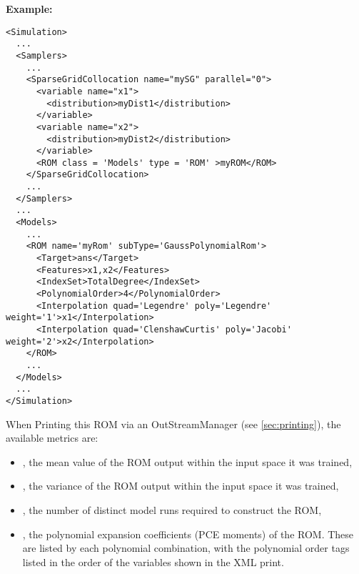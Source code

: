 \textbf{Example:}
{\footnotesize
\begin{lstlisting}[style=XML,morekeywords={name,subType}]
<Simulation>
  ...
  <Samplers>
    ...
    <SparseGridCollocation name="mySG" parallel="0">
      <variable name="x1">
        <distribution>myDist1</distribution>
      </variable>
      <variable name="x2">
        <distribution>myDist2</distribution>
      </variable>
      <ROM class = 'Models' type = 'ROM' >myROM</ROM>
    </SparseGridCollocation>
    ...
  </Samplers>
  ...
  <Models>
    ...
    <ROM name='myRom' subType='GaussPolynomialRom'>
      <Target>ans</Target>
      <Features>x1,x2</Features>
      <IndexSet>TotalDegree</IndexSet>
      <PolynomialOrder>4</PolynomialOrder>
      <Interpolation quad='Legendre' poly='Legendre' weight='1'>x1</Interpolation>
      <Interpolation quad='ClenshawCurtis' poly='Jacobi' weight='2'>x2</Interpolation>
    </ROM>
    ...
  </Models>
  ...
</Simulation>
\end{lstlisting}
}

When Printing this ROM via an OutStreamManager (see \ref{sec:printing}), the available metrics are:
\begin{itemize}
  \item {}, the mean value of the ROM output within the input space it was trained,
  \item {}, the variance of the ROM output within the input space it was trained,
  \item {}, the number of distinct model runs required to construct the ROM,
  \item {}, the polynomial expansion coefficients (PCE moments) of the ROM.  These are
    listed by each polynomial combination, with the polynomial order tags listed in the order of the variables
    shown in the XML print.
\end{itemize}

